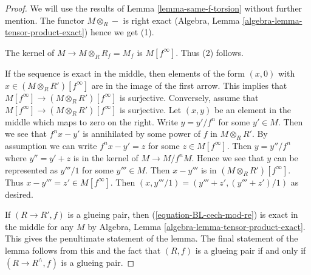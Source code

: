 \documentclass[10pt,a4paper]{amsart}
\theoremstyle{plain}
\theoremstyle{definition}
\theoremstyle{remark}
\numberwithin{equation}{subsection}
\begin{document}
\begin{proof}
We will use the results of Lemma \ref{lemma-same-f-torsion} without
further mention. The functor $M \otimes_R -$ is right exact
(Algebra, Lemma \ref{algebra-lemma-tensor-product-exact})
hence we get (1).

\medskip\noindent
The kernel of $M \to M \otimes_R R_f = M_f$ is $M[f^\infty]$.
Thus (2) follows.

\medskip\noindent
If the sequence is exact in the middle, then elements of the form
$(x, 0)$ with $x \in (M \otimes_R R')[f^\infty]$ are in the image of
the first arrow. This implies that
$M[f^\infty] \to (M \otimes_R R')[f^\infty]$
is surjective. Conversely, assume that
$M[f^\infty] \to (M \otimes_R R')[f^\infty]$
is surjective. Let $(x, y)$ be an element in the middle
which maps to zero on the right. Write $y = y'/f^n$ for some $y' \in M$.
Then we see that $f^n x - y'$ is annihilated by some power of $f$ in
$M \otimes_R R'$. By assumption we can write $f^nx - y' = z$ for some
$z \in M[f^\infty]$. Then $y = y''/f^n$ where $y'' = y' + z$
is in the kernel of $M \to M/f^nM$. Hence we see that $y$ can be
represented as $y'''/1$ for some $y''' \in M$. Then
$x - y'''$ is in $(M \otimes_R R')[f^\infty]$.
Thus $x - y''' = z' \in M[f^\infty]$.
Then $(x, y'''/1) = (y''' + z', (y''' + z')/1)$ as desired.

\medskip\noindent
If $(R \to R', f)$ is a glueing pair, then (\ref{equation-BL-cech-mod-re})
is exact in the middle for any $M$ by
Algebra, Lemma \ref{algebra-lemma-tensor-product-exact}.
This gives the penultimate statement of the lemma.
The final statement of the lemma follows from this and
the fact that $(R, f)$ is a glueing pair if and only if
$(R \to R^\wedge, f)$ is a glueing pair.
\end{proof}
\end{document}
